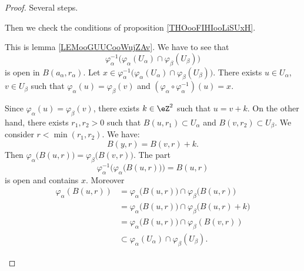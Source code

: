 \begin{proof}
	Several steps.
	\begin{subproof}
		\spitem[It is a manifold]

		Then we check the conditions of proposition \ref{THOooFIHIooLiSUxH}.
		\begin{subproof}
			This is lemma \ref{LEMooGUUCooWujZAv}.
			\spitem[Open]
			We have to see that
			\begin{equation}
				\varphi_{\alpha}^{-1}\big( \varphi_{\alpha}(U_{\alpha})\cap \varphi_{\beta}(U_{\beta}) \big)
			\end{equation}
			is open in \( B(a_{\alpha},r_{\alpha})\). Let \( x\in  \varphi_{\alpha}^{-1}\big( \varphi_{\alpha}(U_{\alpha})\cap \varphi_{\beta}(U_{\beta}) \big)\). There exists \( u\in U_{\alpha}\), \( v\in U_{\beta}\) such that \( \varphi_{\alpha}(u)=\varphi_{\beta}(v)\) and \( (\varphi_{\alpha}\circ\varphi_{\alpha}^{-1})(u)=x\).

			Since \( \varphi_{\alpha}(u)=\varphi_{\beta}(v)\), there exists \( k\in \eZ^2\) such that \( u=v+k\). On the other hand, there exists \( r_1,r_2>0\) such that \( B(u,r_1)\subset U_{\alpha}\) and \( B(v,r_2)\subset U_{\beta}\). We consider \( r<\min(r_1,r_2)\). We have:
			\begin{equation}
				B(y,r)=B(v,r)+k.
			\end{equation}
			Then \( \varphi_{\alpha}\big( B(u,r) \big)=\varphi_{\beta}\big( B(v,r) \big)\). The part
			\begin{equation}
				\varphi_{\alpha}^{-1}\Big( \varphi_{\alpha}\big( B(u,r) \big) \Big)=B(u,r)
			\end{equation}
			is open and contains \( x\). Moreover
			\begin{subequations}
				\begin{align}
					\varphi_{\alpha}(B(u,r)) & =\varphi_{\alpha}\big( B(u,r) \big)\cap\varphi_{\beta}\big( B(u,r) \big)   \\
					                         & =\varphi_{\alpha}\big( B(u,r) \big)\cap\varphi_{\beta}\big( B(u,r)+k \big) \\
					                         & =\varphi_{\alpha}\big( B(u,r) \big)\cap\varphi_{\beta}(B(v,r))             \\
					                         & \subset \varphi_{\alpha}(U_{\alpha})\cap\varphi_{\beta}(U_{\beta}).
				\end{align}
			\end{subequations}


\end{subproof}
\end{subproof}
\end{proof}

